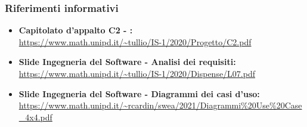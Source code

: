 \subsubsection{Riferimenti informativi}
\begin{itemize}
	\item \textbf{Capitolato d'appalto C2 - \NomeProgetto{}:} \\ \url{https://www.math.unipd.it/~tullio/IS-1/2020/Progetto/C2.pdf}
	\item \textbf{Slide Ingegneria del Software - Analisi dei requisiti:}\\ \url{https://www.math.unipd.it/~tullio/IS-1/2020/Dispense/L07.pdf}
	\item \textbf{Slide Ingegneria del Software - Diagrammi dei casi d'uso:}\\ \url{https://www.math.unipd.it/~rcardin/swea/2021/Diagrammi\%20Use\%20Case_4x4.pdf}
\end{itemize}